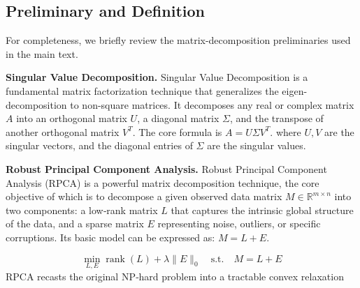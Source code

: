\subsection{Preliminary and Definition}
\label{sec:preliminaries}
For completeness, we briefly review the matrix-decomposition preliminaries used in the main text.

\noindent\textbf{Singular Value Decomposition.} Singular Value Decomposition is a fundamental matrix factorization technique that generalizes the eigen-decomposition to non-square matrices\cite{SVD}. It decomposes any real or complex matrix $A$ into an orthogonal matrix $U$, a diagonal matrix $\Sigma$, and the transpose of another orthogonal matrix $V^T$. The core formula is $A = U \Sigma V^T$.
where $U,V$ are the singular vectors, and the diagonal entries of $\Sigma$ are the singular values. 

\noindent\textbf{Robust Principal Component Analysis.} Robust Principal Component Analysis (RPCA) is a powerful matrix decomposition technique\cite{RPCA}, the core objective of which is to decompose a given observed data matrix $M \in \mathbb{R}^{m \times n}$ into two components: a low‑rank matrix $L$ that captures the intrinsic global structure of the data, and a sparse matrix $E$ representing noise, outliers, or specific corruptions. Its basic model can be expressed as: $M=L+E$.

\begin{equation}
    \min_{L, E} \operatorname{rank}(L) + \lambda \|E\|_0 \quad \text{s.t.} \quad M = L + E \label{eq:RPCA-origin}
\end{equation}
RPCA recasts the original NP‑hard problem into a tractable convex relaxation


